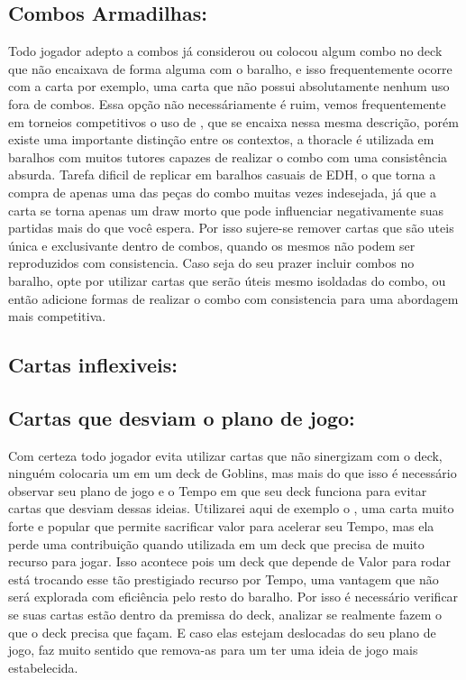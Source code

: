 \subsection{Combos Armadilhas:}
Todo jogador adepto a combos já considerou ou colocou algum combo no deck que não encaixava de forma alguma com o baralho, e isso frequentemente ocorre com a carta  por exemplo, uma carta que não possui absolutamente nenhum uso fora de combos.
Essa opção não necessáriamente é ruim, vemos frequentemente em torneios competitivos o uso de , que se encaixa nessa mesma descrição, porém existe uma importante distinção entre os contextos, a thoracle é utilizada em baralhos com muitos tutores capazes de realizar o combo com uma consistência absurda.
Tarefa dificil de replicar em baralhos casuais de EDH, o que torna a compra de apenas uma das peças do combo muitas vezes indesejada, já que a carta se torna apenas um draw morto que pode influenciar negativamente suas partidas mais do que você espera.
Por isso sujere-se remover cartas que são uteis única e exclusivante dentro de combos, quando os mesmos não podem ser reproduzidos com consistencia.
Caso seja do seu prazer incluir combos no baralho, opte por utilizar cartas que serão úteis mesmo isoldadas do combo, ou então adicione formas de realizar o combo com consistencia para uma abordagem mais competitiva.


\subsection{Cartas inflexiveis:}
\card{}

\subsection{Cartas que desviam o plano de jogo:}
Com certeza todo jogador evita utilizar cartas que não sinergizam com o deck, ninguém colocaria um  em um deck de Goblins, mas mais do que isso é necessário observar seu plano de jogo e o Tempo em que seu deck funciona para evitar cartas que desviam dessas ideias.
Utilizarei aqui de exemplo o , uma carta muito forte e popular que permite sacrificar valor para acelerar seu Tempo, mas ela perde uma contribuição quando utilizada em um deck que precisa de muito recurso para jogar.
Isso acontece pois um deck que depende de Valor para rodar está trocando esse tão prestigiado recurso por Tempo, uma vantagem que não será explorada com eficiência pelo resto do baralho. Por isso é necessário verificar se suas cartas estão dentro da premissa do deck, analizar se realmente fazem o que o deck precisa que façam.
E caso elas estejam deslocadas do seu plano de jogo, faz muito sentido que remova-as para um ter uma ideia de jogo mais estabelecida.


